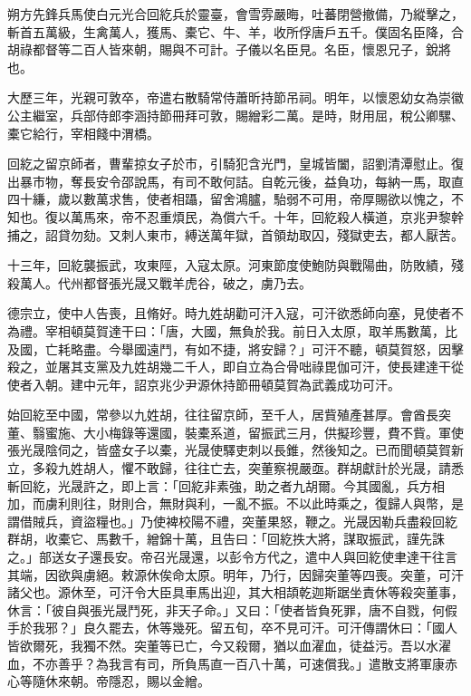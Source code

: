\begin{pinyinscope}
 朔方先鋒兵馬使白元光合回紇兵於靈臺，會雪雰嚴晦，吐蕃閉營撤備，乃縱擊之，斬首五萬級，生禽萬人，獲馬、橐它、牛、羊，收所俘唐戶五千。僕固名臣降，合胡祿都督等二百人皆來朝，賜與不可計。子儀以名臣見。名臣，懷恩兄子，銳將也。



 大歷三年，光親可敦卒，帝遣右散騎常侍蕭昕持節吊祠。明年，以懷恩幼女為崇徽公主繼室，兵部侍郎李涵持節冊拜可敦，賜繒彩二萬。是時，財用屈，稅公卿騾、橐它給行，宰相餞中渭橋。



 回紇之留京師者，曹輩掠女子於市，引騎犯含光門，皇城皆闔，詔劉清潭慰止。復出暴市物，奪長安令邵說馬，有司不敢何詰。自乾元後，益負功，每納一馬，取直四十縑，歲以數萬求售，使者相躡，留舍鴻臚，駘弱不可用，帝厚賜欲以愧之，不知也。復以萬馬來，帝不忍重煩民，為償六千。十年，回紇殺人橫道，京兆尹黎幹捕之，詔貸勿劾。又刺人東市，縛送萬年獄，首領劫取囚，殘獄吏去，都人厭苦。



 十三年，回紇襲振武，攻東陘，入寇太原。河東節度使鮑防與戰陽曲，防敗績，殘殺萬人。代州都督張光晟又戰羊虎谷，破之，虜乃去。



 德宗立，使中人告喪，且脩好。時九姓胡勸可汗入寇，可汗欲悉師向塞，見使者不為禮。宰相頓莫賀達干曰：「唐，大國，無負於我。前日入太原，取羊馬數萬，比及國，亡耗略盡。今舉國遠鬥，有如不捷，將安歸？」可汗不聽，頓莫賀怒，因擊殺之，並屠其支黨及九姓胡幾二千人，即自立為合骨咄祿毘伽可汗，使長建達干從使者入朝。建中元年，詔京兆少尹源休持節冊頓莫賀為武義成功可汗。



 始回紇至中國，常參以九姓胡，往往留京師，至千人，居貲殖產甚厚。會酋長突董、翳蜜施、大小梅錄等還國，裝橐系道，留振武三月，供擬珍豐，費不貲。軍使張光晟陰伺之，皆盛女子以橐，光晟使驛吏刺以長錐，然後知之。已而聞頓莫賀新立，多殺九姓胡人，懼不敢歸，往往亡去，突董察視嚴亟。群胡獻計於光晟，請悉斬回紇，光晟許之，即上言：「回紇非素強，助之者九胡爾。今其國亂，兵方相加，而虜利則往，財則合，無財與利，一亂不振。不以此時乘之，復歸人與幣，是謂借賊兵，資盜糧也。」乃使裨校陽不禮，突董果怒，鞭之。光晟因勒兵盡殺回紇群胡，收橐它、馬數千，繒錦十萬，且告曰：「回紇抶大將，謀取振武，謹先誅之。」部送女子還長安。帝召光晟還，以彭令方代之，遣中人與回紇使聿達干往言其端，因欲與虜絕。敕源休俟命太原。明年，乃行，因歸突董等四喪。突董，可汗諸父也。源休至，可汗令大臣具車馬出迎，其大相頡乾迦斯踞坐責休等殺突董事，休言：「彼自與張光晟鬥死，非天子命。」又曰：「使者皆負死罪，唐不自戮，何假手於我邪？」良久罷去，休等幾死。留五旬，卒不見可汗。可汗傳謂休曰：「國人皆欲爾死，我獨不然。突董等已亡，今又殺爾，猶以血濯血，徒益污。吾以水濯血，不亦善乎？為我言有司，所負馬直一百八十萬，可速償我。」遣散支將軍康赤心等隨休來朝。帝隱忍，賜以金繒。




\end{pinyinscope}
